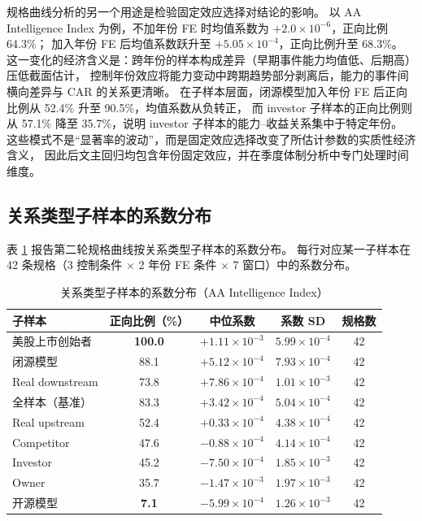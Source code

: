 \documentclass[11pt,fontset=fandol,a4paper]{ctexart}
\begin{document}
规格曲线分析的另一个用途是检验固定效应选择对结论的影响。
以 AA Intelligence Index 为例，不加年份 FE 时均值系数为 $+2.0\times10^{-6}$，正向比例 64.3\%；
加入年份 FE 后均值系数跃升至 $+5.05\times10^{-4}$，正向比例升至 68.3\%。
这一变化的经济含义是：跨年份的样本构成差异（早期事件能力均值低、后期高）压低截面估计，
控制年份效应将能力变动中跨期趋势部分剥离后，能力的事件间横向差异与 CAR 的关系更清晰。
在子样本层面，闭源模型加入年份 FE 后正向比例从 52.4\% 升至 90.5\%，均值系数从负转正，
而 investor 子样本的正向比例则从 57.1\% 降至 35.7\%，说明 investor 子样本的能力--收益关系集中于特定年份。
这些模式不是``显著率的波动''，而是固定效应选择改变了所估计参数的实质性经济含义，
因此后文主回归均包含年份固定效应，并在季度体制分析中专门处理时间维度。

\subsection{关系类型子样本的系数分布}

表 \ref{tab:specr_rel} 报告第二轮规格曲线按关系类型子样本的系数分布。
每行对应某一子样本在 42 条规格（3 控制条件 $\times$ 2 年份 FE 条件 $\times$ 7 窗口）中的系数分布。

\begin{table}[htbp]
\centering
\caption{关系类型子样本的系数分布（AA Intelligence Index）}
\label{tab:specr_rel}
\small
\begin{tabular}{lcccc}
\toprule
子样本 & 正向比例（\%） & 中位系数 & 系数 SD & 规格数 \\
\midrule
美股上市创始者 & \textbf{100.0} & $+1.11\times10^{-3}$ & $5.99\times10^{-4}$ & 42 \\
闭源模型       & 88.1           & $+5.12\times10^{-4}$ & $7.93\times10^{-4}$ & 42 \\
Real downstream & 73.8          & $+7.86\times10^{-4}$ & $1.01\times10^{-3}$ & 42 \\
全样本（基准） & 83.3           & $+3.42\times10^{-4}$ & $5.04\times10^{-4}$ & 42 \\
Real upstream  & 52.4           & $+0.33\times10^{-4}$ & $4.38\times10^{-4}$ & 42 \\
Competitor     & 47.6           & $-0.88\times10^{-4}$ & $4.14\times10^{-4}$ & 42 \\
Investor       & 45.2           & $-7.50\times10^{-4}$ & $1.85\times10^{-3}$ & 42 \\
Owner          & 35.7           & $-1.47\times10^{-3}$ & $1.97\times10^{-3}$ & 42 \\
开源模型       & \textbf{7.1}  & $-5.99\times10^{-4}$ & $1.26\times10^{-3}$ & 42 \\
\bottomrule
\end{tabular}
\end{table}
\end{document}
